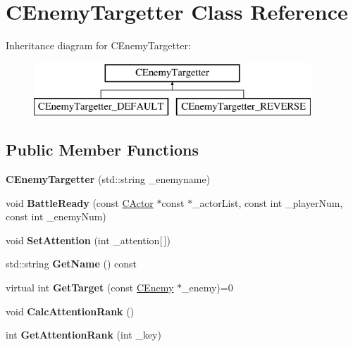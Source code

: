 \hypertarget{class_c_enemy_targetter}{}\section{C\+Enemy\+Targetter Class Reference}
\label{class_c_enemy_targetter}
Inheritance diagram for C\+Enemy\+Targetter\+:\begin{figure}[H]
\begin{center}
\leavevmode
\includegraphics[height=2.000000cm]{class_c_enemy_targetter}
\end{center}
\end{figure}
\subsection*{Public Member Functions}
\begin{DoxyCompactItemize}
\item 
{\bfseries C\+Enemy\+Targetter} (std\+::string \+\_\+enemyname)\hypertarget{class_c_enemy_targetter_a7ecc3fbd1e11b6d8d7c20f23edc9e67e}{}\label{class_c_enemy_targetter_a7ecc3fbd1e11b6d8d7c20f23edc9e67e}

\item 
void {\bfseries Battle\+Ready} (const \hyperlink{class_c_actor}{C\+Actor} $\ast$const $\ast$\+\_\+actor\+List, const int \+\_\+player\+Num, const int \+\_\+enemy\+Num)\hypertarget{class_c_enemy_targetter_a7a806237d0572e0e99d7436f490819e4}{}\label{class_c_enemy_targetter_a7a806237d0572e0e99d7436f490819e4}

\item 
void {\bfseries Set\+Attention} (int \+\_\+attention\mbox{[}$\,$\mbox{]})\hypertarget{class_c_enemy_targetter_a78335cd359e3354d60068348c2853e33}{}\label{class_c_enemy_targetter_a78335cd359e3354d60068348c2853e33}

\item 
std\+::string {\bfseries Get\+Name} () const \hypertarget{class_c_enemy_targetter_a464d9e107f03ac604878cafb71b62636}{}\label{class_c_enemy_targetter_a464d9e107f03ac604878cafb71b62636}

\item 
virtual int {\bfseries Get\+Target} (const \hyperlink{class_c_enemy}{C\+Enemy} $\ast$\+\_\+enemy)=0\hypertarget{class_c_enemy_targetter_af1224ba428b8ec538c665be65c3821e6}{}\label{class_c_enemy_targetter_af1224ba428b8ec538c665be65c3821e6}

\item 
void {\bfseries Calc\+Attention\+Rank} ()\hypertarget{class_c_enemy_targetter_a71cd33e88d6775738e76ed87d2399465}{}\label{class_c_enemy_targetter_a71cd33e88d6775738e76ed87d2399465}

\item 
int {\bfseries Get\+Attention\+Rank} (int \+\_\+key)\hypertarget{class_c_enemy_targetter_a59a3f4ace2840d37aa7559e08d312c58}{}\label{class_c_enemy_targetter_a59a3f4ace2840d37aa7559e08d312c58}

\end{DoxyCompactItemize}
